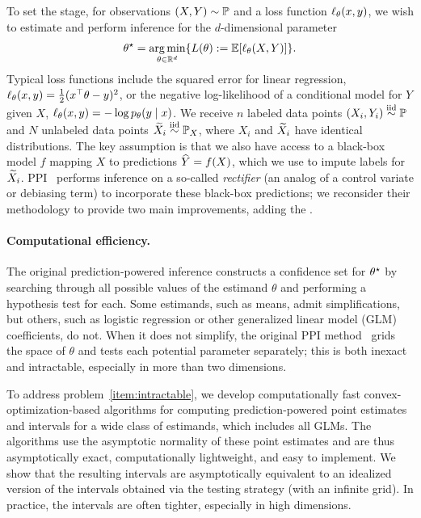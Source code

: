To set the stage, for observations $(X, Y) \sim \P$ and a loss function
$\loss_\theta(x, y)$, we wish to estimate and perform
inference for the
$d$-dimensional parameter
\begin{equation}
  \label{eq:m-est}
  \theta\opt = \argmin_{\theta \in \R^d}
  \{L(\theta) \defeq \E[\loss_\theta(X, Y)]\}.
\end{equation}
Typical loss functions include the squared error for linear
regression, $\loss_\theta(x, y) = \half(x^\top \theta - y)^2$, or the
negative log-likelihood of a conditional model for $Y$ given $X$,
$\loss_\theta(x, y) = -\log p_\theta(y \mid x)$.  We receive $n$
labeled data points $(X_i, Y_i) \simiid \P$ and $N$ unlabeled data points
$\Xt_i \simiid \Px$, where $X_i$ and $\Xt_i$ have identical distributions.
The key assumption is that we also have access to a black-box model $f$
mapping $X$ to predictions $\what{Y} = f(X)$, which we use to impute
labels for $\Xt_i$. PPI~\cite{AngelopoulosBaFaJoZr23} performs inference on a so-called \emph{rectifier} (an analog of a control variate or debiasing
term) to incorporate these black-box predictions; we reconsider
their methodology to provide two main improvements, adding the
\texttt{\raisebox{.0ex}{++}}.

\paragraph{\texttt{\raisebox{.0ex}{+}}Computational efficiency.}
The original prediction-powered inference constructs a confidence set
for $\theta\opt$ by searching through all possible values of
the estimand $\theta$ and performing a hypothesis test for each.
%
Some estimands, such as means, admit simplifications, but others, such as
logistic regression or other generalized linear model (GLM) coefficients, do
not. When it does not simplify, the original PPI
method~\cite{AngelopoulosBaFaJoZr23} grids the space of $\theta$ and tests
each potential parameter separately; this is both inexact and intractable,
especially in more than two dimensions. 

To address problem~\ref{item:intractable}, we develop computationally fast
convex-optimization-based algorithms for computing prediction-powered point
estimates and intervals for a wide class of estimands, which includes
all GLMs.  The algorithms use the asymptotic normality of these point
estimates and are thus asymptotically exact, computationally lightweight,
and easy to implement.  We show that the resulting intervals are
asymptotically equivalent to an idealized version of the intervals obtained
via the testing strategy (with an infinite grid).  In practice, the
intervals are often tighter, especially in high dimensions.

